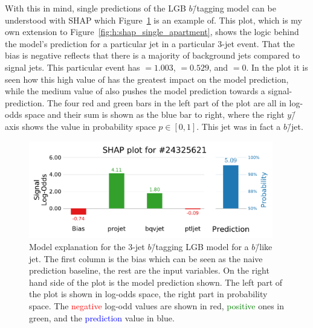 With this in mind, single predictions of the LGB $b$\=/tagging model can be understood with SHAP which Figure~\ref{fig:q:shap_single_prediction_3j} is an example of. This plot, which is my own extension to Figure~\ref{fig:h:shap_single_apartment}, shows the logic behind the model's prediction for a particular jet in a particular 3-jet event. That the bias is negative reflects that there is a majority of background jets compared to signal jets. This particular event has $=1.003$, $=0.529$, and $=0$. In the plot it is seen how this high value of  has the greatest impact on the model prediction, while the medium value of  also pushes the model prediction towards a signal-prediction. The four red and green bars in the left part of the plot are all in log-odds space and their sum is shown as the blue bar to right, where the right $y$\=/axis shows the value in probability space $p\in [0,1]$. This jet was in fact a $b$\=/jet.

\begin{figure}[h!]
  \centerfloat
  \includegraphics[width=0.95\textwidth, trim=0 0 0 40, clip]{figures/quarks/shap_values-down_sample=1.00-ML_vars=vertex-selection=b-ejet_min=4-n_iter_RS_lgb=99-n_iter_RS_xgb=9-cdot_cut=0.90-version=19-njet=3loc=24325621.pdf}
  \caption[SHAP 3-Jet Model Explanation for $b$\=/like Jet]
          {Model explanation for the 3-jet $b$\=/tagging LGB model for a $b$\=/like jet. The first column is the bias which can be seen as the naive prediction baseline, the rest are the input variables. On the right hand side of the plot is the model prediction shown. The left part of the plot is shown in log-odds space, the right part in probability space. The \textcolor{red}{negative} log-odd values are shown in red, \textcolor{green}{positive} ones in green, and the \textcolor{blue}{prediction} value in blue. 
          } 
  \label{fig:q:shap_single_prediction_3j}
\end{figure}



